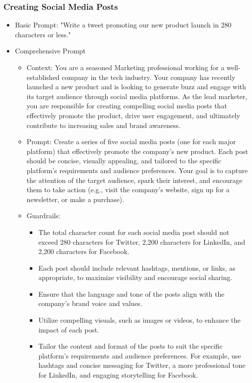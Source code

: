 \begin{frame}[fragile]\frametitle{Creating Social Media Posts}
\begin{itemize}
\item Basic Prompt: "Write a tweet promoting our new product launch in 280 characters or less."
\item Comprehensive Prompt
	\begin{itemize}
	\item Context: You are a seasoned Marketing professional working for a well-established company in the tech industry. Your company has recently launched a new product and is looking to generate buzz and engage with its target audience through social media platforms. As the lead marketer, you are responsible for creating compelling social media posts that effectively promote the product, drive user engagement, and ultimately contribute to increasing sales and brand awareness.
	\item Prompt: Create a series of five social media posts (one for each major platform) that effectively promote the company's new product. Each post should be concise, visually appealing, and tailored to the specific platform's requirements and audience preferences. Your goal is to capture the attention of the target audience, spark their interest, and encourage them to take action (e.g., visit the company's website, sign up for a newsletter, or make a purchase).
	\item Guardrails: 
		\begin{itemize}
		\item The total character count for each social media post should not exceed 280 characters for Twitter, 2,200 characters for LinkedIn, and 2,200 characters for Facebook.
		\item Each post should include relevant hashtags, mentions, or links, as appropriate, to maximize visibility and encourage social sharing.
		\item Ensure that the language and tone of the posts align with the company's brand voice and values.
		\item Utilize compelling visuals, such as images or videos, to enhance the impact of each post.
		\item Tailor the content and format of the posts to suit the specific platform's requirements and audience preferences. For example, use hashtags and concise messaging for Twitter, a more professional tone for LinkedIn, and engaging storytelling for Facebook.
		\end{itemize}	
	\end{itemize}
\end{itemize}
\end{frame}

